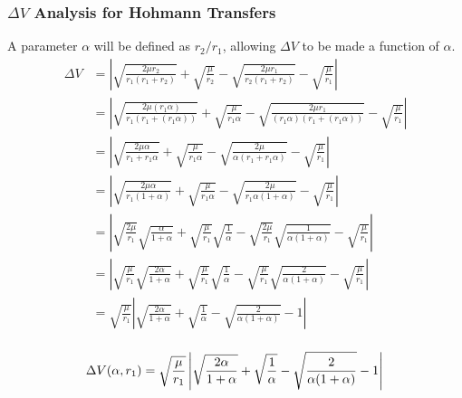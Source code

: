 \documentclass{article}
\begin{document}
\subsubsection{\texorpdfstring{$\Delta V$}{DeltaV} Analysis for Hohmann Transfers}

A parameter $\alpha$ will be defined as $r_2/r_1$, allowing $\Delta V$ to be made a function of $\alpha$.
\begin{align*}
    \Delta V & = \left|\sqrt{\frac{2\mu{}r_2}{r_1(r_1+r_2)}}+\sqrt{\frac{\mu}{r_2}}-\sqrt{\frac{2\mu{}r_1}{r_2(r_1+r_2)}}-\sqrt{\frac{\mu}{r_1}}\right|                                                           \\
             & = \left|\sqrt{\frac{2\mu{}(r_1\alpha)}{r_1(r_1+(r_1\alpha))}}+\sqrt{\frac{\mu}{r_1\alpha}}-\sqrt{\frac{2\mu{}r_1}{(r_1\alpha)(r_1+(r_1\alpha))}}-\sqrt{\frac{\mu}{r_1}}\right|                     \\
             & = \left|\sqrt{\frac{2\mu\alpha}{r_1+r_1\alpha}}+\sqrt{\frac{\mu}{r_1\alpha}}-\sqrt{\frac{2\mu}{\alpha(r_1+r_1\alpha)}}-\sqrt{\frac{\mu}{r_1}}\right|                                               \\
             & = \left|\sqrt{\frac{2\mu\alpha}{r_1(1+\alpha)}}+\sqrt{\frac{\mu}{r_1\alpha}}-\sqrt{\frac{2\mu}{r_1\alpha(1+\alpha)}}-\sqrt{\frac{\mu}{r_1}}\right|                                                 \\
             & = \left|\sqrt{\frac{2\mu}{r_1}}\sqrt{\frac{\alpha}{1+\alpha}}+\sqrt{\frac{\mu}{r_1}}\sqrt{\frac{1}{\alpha}}-\sqrt{\frac{2\mu}{r_1}}\sqrt{\frac{1}{\alpha(1+\alpha)}}-\sqrt{\frac{\mu}{r_1}}\right| \\
             & = \left|\sqrt{\frac{\mu}{r_1}}\sqrt{\frac{2\alpha}{1+\alpha}}+\sqrt{\frac{\mu}{r_1}}\sqrt{\frac{1}{\alpha}}-\sqrt{\frac{\mu}{r_1}}\sqrt{\frac{2}{\alpha(1+\alpha)}}-\sqrt{\frac{\mu}{r_1}}\right|  \\
             & = \sqrt{\frac{\mu}{r_1}}\left|\sqrt{\frac{2\alpha}{1+\alpha}}+\sqrt{\frac{1}{\alpha}}-\sqrt{\frac{2}{\alpha(1+\alpha)}}-1\right|                                                                   \\
\end{align*}

\begin{equation}\label{Delta V in terms of Alpha Hohmann}
    \Delta V(\alpha, r_1) = \sqrt{\frac{\mu}{r_1}}\left|\sqrt{\frac{2\alpha}{1+\alpha}}+\sqrt{\frac{1}{\alpha}}-\sqrt{\frac{2}{\alpha(1+\alpha)}}-1\right|\\
\end{equation}
\end{document}
